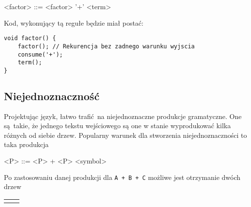 \documentclass[leqno, 12pt]{article}
\newcommand{\spacing}{\vskip 0.5cm}
\begin{document}
		    \begin{grammar}
		    	<factor> ::= <factor> '+' <term>
			\end{grammar}

			\spacing

			Kod, wykonujący tą regułe będzie miał postać:
			
			\spacing

			\begin{lstlisting}[label={lst:left-recursion}]
void factor() {
	factor(); // Rekurencja bez zadnego warunku wyjscia
	consume('+');
	term();
}
			\end{lstlisting}
		
		\subsection{Niejednoznaczność}
		
			Projektując język, łatwo trafić na niejednoznaczne produkcje gramatyczne. One są takie, że
			jednego tekstu wejściowego są one w stanie wyprodukować kilka różnych od siebie drzew. Popularny
			warunek dla stworzenia niejednoznaczności to taka produkcja
			
			\begin{grammar}
		        <P> ::= <P> + <P>
				\alt <symbol>
			\end{grammar}
			
			
			Po zastosowaniu danej produkcji dla \texttt{A + B + C} możliwe jest otrzymanie dwóch drzew
			
			\spacing
			\spacing

			\begin{center}
				\begin{tabular}{ L{5cm} L{5cm} }
					&
				\end{tabular}
			\end{center}
			
\end{document}
